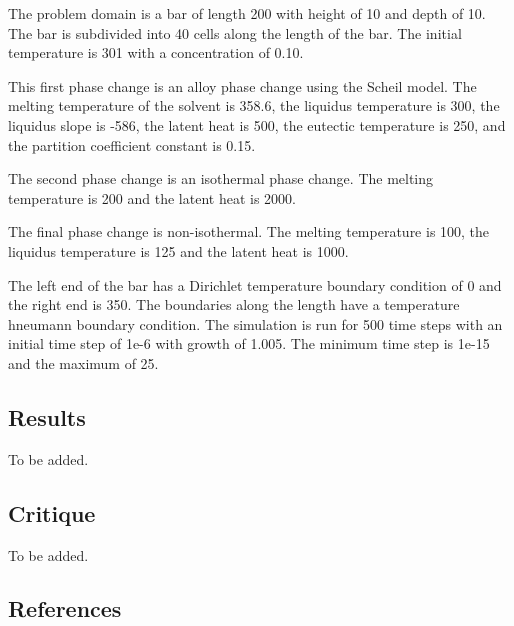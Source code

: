 \documentclass[12pt]{article}
\begin{document}
The problem domain is a bar of length 200 with height of 10 and depth of 10.  The bar is subdivided into 40 cells along the length of the bar.  The initial temperature is 301 with a concentration of 0.10.  

This first phase change is an alloy phase change using the Scheil model.  The melting temperature of the solvent is 358.6, the liquidus temperature is 300, the liquidus slope is -586, the latent heat is 500, the eutectic temperature is 250, and the partition coefficient constant is 0.15.

The second phase change is an isothermal phase change. The melting temperature is 200 and the latent heat is 2000.

The final phase change is non-isothermal.  The melting temperature is 100, the liquidus temperature is 125 and the latent heat is 1000.

The left end of the bar has a Dirichlet temperature boundary condition of 0 and the right end is 350.  The boundaries along the length have a temperature hneumann boundary condition.  The simulation is run for 500 time steps with an initial time step of 1e-6 with growth of 1.005.  The minimum time step is 1e-15 and the maximum of 25.

\subsection*{Results}

To be added.

\subsection*{Critique}

To be added.

\subsection*{References}
\end{document}
